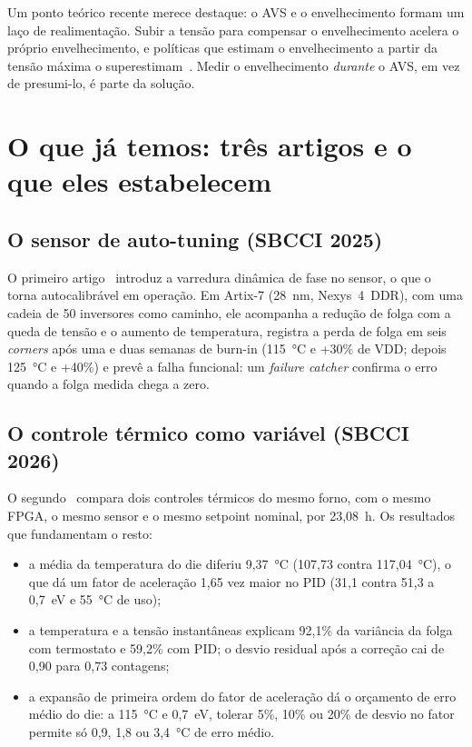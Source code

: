 \documentclass[11pt,a4paper]{article}
\begin{document}
Um ponto teórico recente merece destaque: o AVS e o envelhecimento formam um laço de realimentação. Subir a tensão para
compensar o envelhecimento acelera o próprio envelhecimento, e políticas que estimam o envelhecimento a partir da tensão
máxima o superestimam~\cite{xie2026agingavs}. Medir o envelhecimento \emph{durante} o AVS, em vez de presumi-lo, é parte da
solução.

\section{O que já temos: três artigos e o que eles estabelecem}

\subsection{O sensor de auto-tuning (SBCCI 2025)}

O primeiro artigo~\cite{nogueira2025autotuning} introduz a varredura dinâmica de fase no sensor, o que o torna autocalibrável
em operação. Em Artix-7 (28~nm, Nexys~4~DDR), com uma cadeia de 50 inversores como caminho, ele acompanha a redução de
folga com a queda de tensão e o aumento de temperatura, registra a perda de folga em seis \emph{corners} após uma e duas
semanas de burn-in (115~°C e +30\% de VDD; depois 125~°C e +40\%) e prevê a falha funcional: um \emph{failure catcher}
confirma o erro quando a folga medida chega a zero.

\subsection{O controle térmico como variável (SBCCI 2026)}

O segundo~\cite{alencar2026sbcci} compara dois controles térmicos do mesmo forno, com o mesmo FPGA, o mesmo sensor e o mesmo
setpoint nominal, por 23,08~h. Os resultados que fundamentam o resto:
\begin{itemize}
  \item a média da temperatura do die diferiu 9,37~°C (107,73 contra 117,04~°C), o que dá um fator de aceleração 1,65 vez
        maior no PID (31,1 contra 51,3 a 0,7~eV e 55~°C de uso);
  \item a temperatura e a tensão instantâneas explicam 92,1\% da variância da folga com termostato e 59,2\% com PID; o
        desvio residual após a correção cai de 0,90 para 0,73 contagens;
  \item a expansão de primeira ordem do fator de aceleração dá o orçamento de erro médio do die: a 115~°C e 0,7~eV,
        tolerar 5\%, 10\% ou 20\% de desvio no fator permite só 0,9, 1,8 ou 3,4~°C de erro médio.
\end{itemize}
\end{document}
